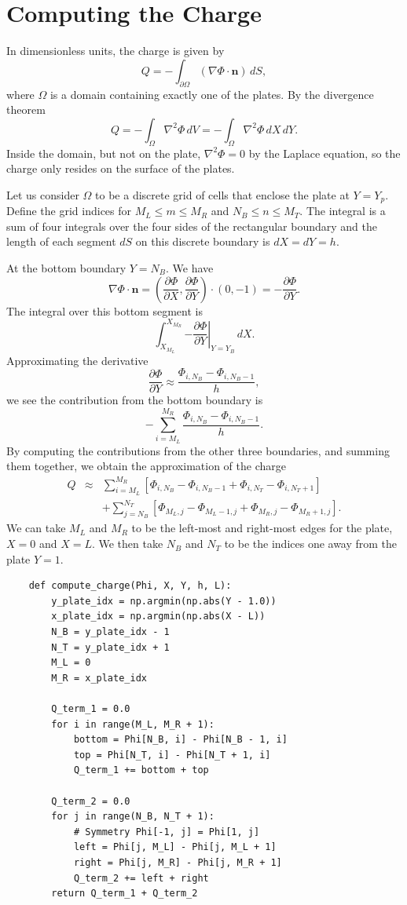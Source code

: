 \documentclass{article}
\newcommand{\pder}[2][]{\frac{\partial#1}{\partial#2}}
\begin{document}
\section{Computing the Charge}

In dimensionless units, the charge is given by
\[ Q = -\int_{\partial \Omega} (\nabla\Phi \cdot \mathbf{n})\,dS, \]
where \(\Omega\) is a domain containing exactly one of the plates. By the divergence theorem
\[ Q = -\int_{\Omega} \nabla^2 \Phi \,dV = -\int_{\Omega} \nabla^2 \Phi \,dX\,dY. \]
Inside the domain, but not on the plate, \(\nabla^2 \Phi = 0\) by the Laplace equation, so the charge only resides on the surface of the plates.

Let us consider \(\Omega\) to be a discrete grid of cells that enclose the plate at \(Y = Y_p\). Define the grid indices for \(M_L \leq m \leq M_R\) and \(N_B \leq n \leq M_T\). The integral is a sum of four integrals over the four sides of the rectangular boundary and the length of each segment \(dS\) on this discrete boundary is \(dX = dY = h\).

At the bottom boundary \(Y = N_B\). We have
\[ \nabla \Phi\cdot\mathbf{n} = \left(\pder[\Phi]{X}, \pder[\Phi]{Y}\right) \cdot (0, -1) = -\pder[\Phi]{Y}. \]
The integral over this bottom segment is
\[ \int_{X_{M_L}}^{X_{M_R}} \left.-\pder[\Phi]{Y}\right|_{Y = Y_B} \,dX. \]
Approximating the derivative
\[ \pder[\Phi]{Y} \approx \frac{\Phi_{i, N_B} - \Phi_{i, N_B - 1}}{h}, \]
we see the contribution from the bottom boundary is
\[ -\sum_{i=M_L}^{M_R} \frac{\Phi_{i, N_B} - \Phi_{i, N_B - 1}}{h}. \]
By computing the contributions from the other three boundaries, and summing them together, we obtain the approximation of the charge
\begin{eqnarray*} 
    Q & \approx & 
    \sum_{i=M_L}^{M_R}[\Phi_{i, N_B} - \Phi_{i, N_B-1} + \Phi_{i, N_T} - \Phi_{i, N_T+1}] \\
    & & + \sum_{j=N_B}^{N_T}[\Phi_{M_L, j} - \Phi_{M_L-1, j} + \Phi_{M_R, j} - \Phi_{M_R+1, j}].
\end{eqnarray*}
We can take \(M_L\) and \(M_R\) to be the left-most and right-most edges for the plate, \(X=0\) and \(X=L\). We then take \(N_B\) and \(N_T\) to be the indices one away from the plate \(Y=1\). 

\begin{verbatim}
    def compute_charge(Phi, X, Y, h, L):
        y_plate_idx = np.argmin(np.abs(Y - 1.0))
        x_plate_idx = np.argmin(np.abs(X - L))
        N_B = y_plate_idx - 1
        N_T = y_plate_idx + 1
        M_L = 0
        M_R = x_plate_idx
    
        Q_term_1 = 0.0
        for i in range(M_L, M_R + 1):
            bottom = Phi[N_B, i] - Phi[N_B - 1, i]
            top = Phi[N_T, i] - Phi[N_T + 1, i]
            Q_term_1 += bottom + top
    
        Q_term_2 = 0.0
        for j in range(N_B, N_T + 1):
            # Symmetry Phi[-1, j] = Phi[1, j]
            left = Phi[j, M_L] - Phi[j, M_L + 1]
            right = Phi[j, M_R] - Phi[j, M_R + 1]
            Q_term_2 += left + right
        return Q_term_1 + Q_term_2
\end{verbatim}
\end{document}
